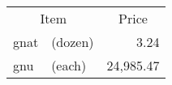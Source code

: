 \documentclass{article}
\begin{document}
\setcounter{equation}{0}
\begin{tabular}{llr}
\multicolumn{2}{c}{Item} & \multicolumn{1}{c}{Price} \\
gnat      & (dozen)  & 3.24\\
gnu       & (each)   & 24,985.47
\end{tabular}
\end{document}
